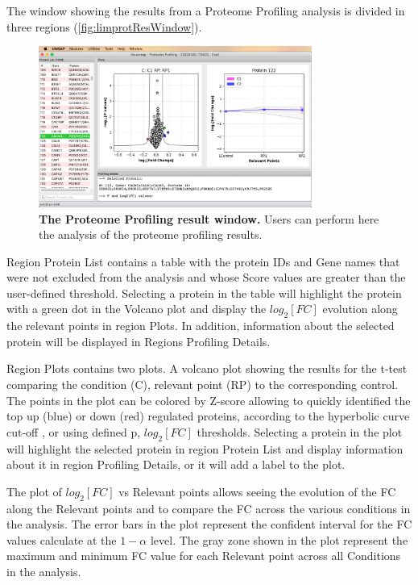 The window showing the results from a Proteome Profiling analysis is divided in three
regions (\autoref{fig:limprotResWindow}).

\begin{figure}[h]
    \centering
    \includegraphics[width=0.8\textwidth]{./IMAGES/MOD-PROTPROF/protprof-frag.jpg}
    \caption[The Proteome Profiling result window]{\textbf{The Proteome Profiling
    result window.} Users can perform here the analysis of the proteome profiling
    results.} 
    \label{fig:protprofResultsWindow}
    \vspace{-5pt} 	
\end{figure}

Region Protein List contains a table with the protein IDs and Gene names that were not
excluded from the analysis and whose Score values are greater than the user-defined
threshold. Selecting a protein in the table will highlight the protein with a green
dot in the Volcano plot and display the $log_2[FC]$ evolution along the relevant points
in region Plots. In addition, information about the selected protein will be displayed
in Regions Profiling Details.

Region Plots contains two plots. A volcano plot showing the results for the t-test
comparing the condition (C), relevant point (RP) to the corresponding control. The
points in the plot can be colored by Z-score allowing to quickly identified the top
up (blue) or down (red) regulated proteins, according to the hyperbolic curve cut-off
\cite{LI2012}, or using defined p, $log_2[FC]$ thresholds. Selecting a protein in 
the plot will highlight the selected protein in region Protein List and display 
information about it in region Profiling Details, or it will add a label to the plot.

The plot of $log_2[FC]$ vs Relevant points allows seeing the evolution of the FC
along the Relevant points and to compare the FC across the various conditions in
the analysis. The error bars in the plot represent the confident interval for the
FC values calculate at the $1-\alpha$ level. The gray zone shown in the plot represent
the maximum and minimum FC value for each Relevant point across all Conditions in
the analysis.

